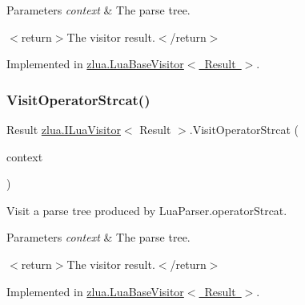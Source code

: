 \begin{DoxyParams}{Parameters}
{\em context} & The parse tree.\\
\hline
\end{DoxyParams}
$<$return$>$The visitor result.$<$/return$>$ 

Implemented in \mbox{\hyperlink{classzlua_1_1_lua_base_visitor_a9fae59028299794afc9f4cbaa8db8cb9}{zlua.\+Lua\+Base\+Visitor$<$ Result $>$}}.

\mbox{\label{interfacezlua_1_1_i_lua_visitor_a1020362b6ec3e02795836cd5cd07cfe4}} 
\subsubsection{\texorpdfstring{Visit\+Operator\+Strcat()}{VisitOperatorStrcat()}}
{\footnotesize\ttfamily Result \mbox{\hyperlink{interfacezlua_1_1_i_lua_visitor}{zlua.\+I\+Lua\+Visitor}}$<$ Result $>$.Visit\+Operator\+Strcat (\begin{DoxyParamCaption}\item[{\mbox{[}\+Not\+Null\mbox{]} \mbox{\hyperlink{classzlua_1_1_lua_parser_1_1_operator_strcat_context}{Lua\+Parser.\+Operator\+Strcat\+Context}}}]{context }\end{DoxyParamCaption})}



Visit a parse tree produced by Lua\+Parser.\+operator\+Strcat. 


\begin{DoxyParams}{Parameters}
{\em context} & The parse tree.\\
\hline
\end{DoxyParams}
$<$return$>$The visitor result.$<$/return$>$ 

Implemented in \mbox{\hyperlink{classzlua_1_1_lua_base_visitor_a1a5bcdac1187b46cbb8d731919052d09}{zlua.\+Lua\+Base\+Visitor$<$ Result $>$}}.

\mbox{\label{interfacezlua_1_1_i_lua_visitor_aef0728911afc4d23d64f1b6f0cd575b3}} 
